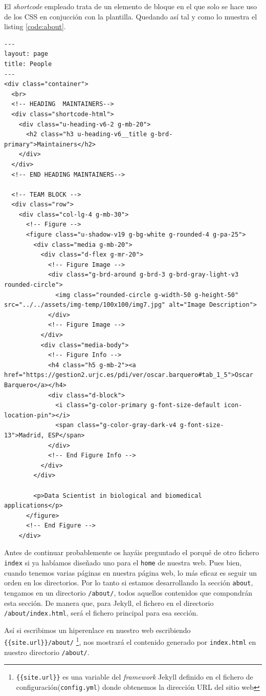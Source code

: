 El \textit{shortcode} empleado trata de un elemento de bloque en el que solo se hace uso de los CSS en conjucción con la plantilla. Quedando así tal y como lo muestra el listing \ref{code:about}. 
\begin{lstlisting}[style=htmlcssjs,caption=index.html de About,label={code:about}]
---
layout: page
title: People
---
<div class="container">
  <br>
  <!-- HEADING  MAINTAINERS-->
  <div class="shortcode-html">
    <div class="u-heading-v6-2 g-mb-20">
      <h2 class="h3 u-heading-v6__title g-brd-primary">Maintainers</h2>
    </div>
  </div>
  <!-- END HEADING MAINTAINERS-->

  <!-- TEAM BLOCK -->
  <div class="row">
    <div class="col-lg-4 g-mb-30">
      <!-- Figure -->
      <figure class="u-shadow-v19 g-bg-white g-rounded-4 g-pa-25">
        <div class="media g-mb-20">
          <div class="d-flex g-mr-20">
            <!-- Figure Image -->
            <div class="g-brd-around g-brd-3 g-brd-gray-light-v3 rounded-circle">
              <img class="rounded-circle g-width-50 g-height-50" src="../../assets/img-temp/100x100/img7.jpg" alt="Image Description">
            </div>
            <!-- Figure Image -->
          </div>
          <div class="media-body">
            <!-- Figure Info -->
            <h4 class="h5 g-mb-2"><a href="https://gestion2.urjc.es/pdi/ver/oscar.barquero#tab_1_5">Oscar Barquero</a></h4>
            <div class="d-block">
              <i class="g-color-primary g-font-size-default icon-location-pin"></i>
              <span class="g-color-gray-dark-v4 g-font-size-13">Madrid, ESP</span>
            </div>
            <!-- End Figure Info -->
          </div>
        </div>

        <p>Data Scientist in biological and biomedical applications</p>
      </figure>
      <!-- End Figure -->
    </div>
\end{lstlisting}

Antes de continuar probablemente os hayáis preguntado el porqué de otro fichero \texttt{index} si ya habíamos diseñado uno para el \texttt{home} de nuestra web. Pues bien,  cuando tenemos varias páginas en nuestra página web, lo más eficaz es seguir un orden en los directorios. Por lo tanto si estamos desarrollando la sección \texttt{about}, tengamos en un directorio \texttt{/about/}, todos aquellos contenidos que compondrán esta sección. De manera que, para Jekyll, el fichero en el directorio \texttt{/about/index.html}, será el fichero principal para esa sección.

Así si escribimos un hiperenlace en nuestro web escribiendo \texttt{\{\{site.url\}\}/about/} \footnote{\texttt{\{\{site.url\}\}} es una variable del \textit{framework} Jekyll definido en el fichero de configuración(\texttt{config.yml}) donde obtenemos la dirección URL del sitio web}, nos mostrará el contenido generado por \texttt{index.html} en nuestro directorio \texttt{/about/}.

